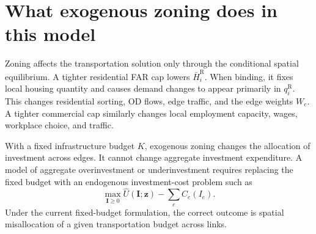 \documentclass[12pt,a4paper]{article}
\newcommand{\R}{\mathrm{R}}
\newcommand{\1}{\mathbb 1}
\begin{document}
\section{What exogenous zoning does in this model}

Zoning affects the transportation solution only through the conditional spatial equilibrium. A tighter residential FAR cap lowers $\bar H_i^{\R}$. When binding, it fixes local housing quantity and causes demand changes to appear primarily in $q_i^{\R}$. This changes residential sorting, OD flows, edge traffic, and the edge weights $W_e$. A tighter commercial cap similarly changes local employment capacity, wages, workplace choice, and traffic.

With a fixed infrastructure budget $K$, exogenous zoning changes the allocation of investment across edges. It cannot change aggregate investment expenditure. A model of aggregate overinvestment or underinvestment requires replacing the fixed budget with an endogenous investment-cost problem such as
\[
\max_{\mathbf I\geq0}
\widehat U(\mathbf I;\mathbf z)-\sum_eC_e(I_e).
\]
Under the current fixed-budget formulation, the correct outcome is spatial misallocation of a given transportation budget across links.

\printbibliography
\end{document}
